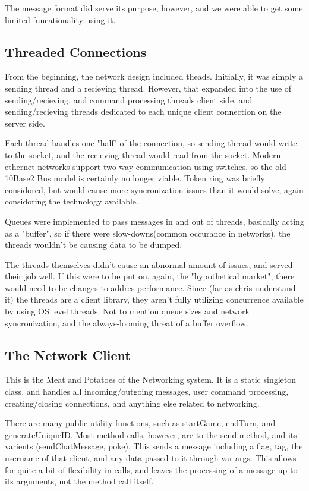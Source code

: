 \documentclass[12pt,a4paper]{article}
\begin{document}
The message format did serve its purpose, however, and we were able to get some limited funcationality using it.

\subsection{Threaded Connections}

From the beginning, the network design included theads. Initially, it was simply a sending thread and a recieving thread. 
However, that expanded into the use of sending/recieving, and command processing threads client side, and sending/recieving threads
dedicated to each unique client connection on the server side.

Each thread handles one "half" of the connection, so sending thread would write to the socket, and the recieving thread would read from the socket. Modern ethernet networks
support two-way communication using switches, so the old 10Base2 Bus model is certainly no longer viable. Token ring was briefly considored, but would cause more syncronization issues
than it would solve, again considoring the technology available. 

Queues were implemented to pass messages in and out of threads, basically acting as a "buffer", so if there were slow-downs(common occurance in networks), 
the threads wouldn't be causing data to be dumped.

The threads themselves didn't cause an abnormal amount of issues, and served their job well. 
If this were to be put on, again, the "hypothetical market", there would need to be changes to addres performance. Since (far as chris understand it) the threads
are a client library, they aren't fully utilizing concurrence available by using OS level threads. Not to mention queue sizes and network syncronization, and the always-looming
threat of a buffer overflow.

\subsection{The Network Client}

This is the Meat and Potatoes of the Networking system. It is a static singleton class, and handles all incoming/outgoing messages, user command processing, creating/closing connections, and anything else related to networking.

There are many public utility functions, such as startGame, endTurn, and generateUniqueID.
Most method calls, however, are to the send method, and its varients (sendChatMessage, poke). This sends a message including a flag, tag, the username of that client, and any data passed to it through var-args. This allows for quite a bit of flexibility in calls, and leaves the processing of a message up to its arguments, not the method call itself.
\end{document}
